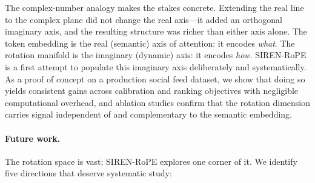 \documentclass{article}
\begin{document}
The complex-number analogy makes the stakes concrete. Extending the real line
to the complex plane did not change the real axis---it added an orthogonal
imaginary axis, and the resulting structure was richer than either axis alone.
The token embedding is the real (semantic) axis of attention: it encodes
\emph{what}. The rotation manifold is the imaginary (dynamic) axis: it
encodes \emph{how}. SIREN-RoPE is a first attempt to populate this imaginary
axis deliberately and systematically. As a proof of concept on a production social feed dataset, we show that
doing so yields consistent gains across calibration and ranking objectives
with negligible computational overhead, and ablation studies confirm that
the rotation dimension carries signal independent of and complementary to
the semantic embedding.

\paragraph{Future work.}
The rotation space is vast; SIREN-RoPE explores one corner of it. We identify
five directions that deserve systematic study:
\end{document}
